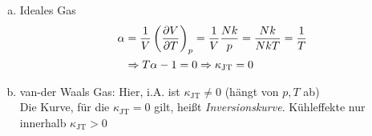 \begin{enumerate}[a)]  %
    \item Ideales Gas
    \begin{equation}
        \begin{split}
            \alpha &= \frac{1}{V} \left( \frac{\partial V}{\partial T} \right)_{p} = \frac{1}{V} \frac{N k}{p} = \frac{N k}{N k T} = \frac{1}{T} \\
            & \Rightarrow T \alpha - 1 = 0 \Rightarrow \kappa_\text{JT} = 0
        \end{split}
    \end{equation}
    \item van-der Waals Gas: Hier, i.A. ist $\kappa_\text{JT} \neq 0$ (hängt von $p, T$ ab) \\
    Die Kurve, für die $\kappa_\text{JT} = 0 $ gilt, heißt \emph{Inversionskurve}. Kühleffekte nur innerhalb
    $\kappa_\text{JT} > 0$
\end{enumerate}

